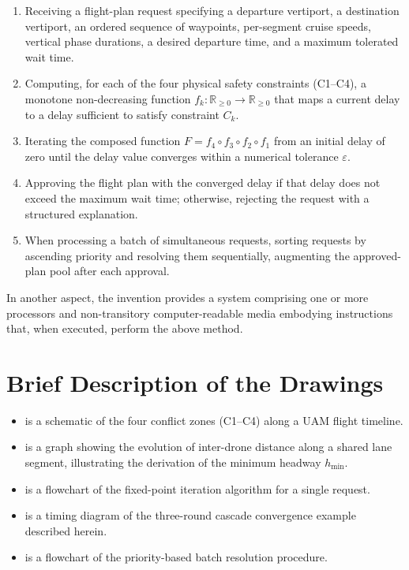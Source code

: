 \documentclass[12pt,a4paper]{article}
\newcommand{\hmin}{h_{\min}}
\begin{document}
\begin{enumerate}[label=(\alph*)]
  \item Receiving a flight-plan request specifying a departure vertiport, a
    destination vertiport, an ordered sequence of waypoints, per-segment
    cruise speeds, vertical phase durations, a desired departure time, and a
    maximum tolerated wait time.

  \item Computing, for each of the four physical safety constraints (C1--C4),
    a monotone non-decreasing function $f_k\colon \mathbb{R}_{\ge 0} \to
    \mathbb{R}_{\ge 0}$ that maps a current delay to a delay sufficient to
    satisfy constraint $C_k$.

  \item Iterating the composed function $F = f_4 \circ f_3 \circ f_2 \circ f_1$
    from an initial delay of zero until the delay value converges within a
    numerical tolerance $\varepsilon$.

  \item Approving the flight plan with the converged delay if that delay does
    not exceed the maximum wait time; otherwise, rejecting the request with a
    structured explanation.

  \item When processing a batch of simultaneous requests, sorting requests by
    ascending priority and resolving them sequentially, augmenting the approved-
    plan pool after each approval.
\end{enumerate}

In another aspect, the invention provides a system comprising one or more
processors and non-transitory computer-readable media embodying instructions
that, when executed, perform the above method.

\section{Brief Description of the Drawings}

\begin{itemize}
  \item[\textbf{FIG.\,1}] is a schematic of the four conflict zones (C1--C4)
    along a UAM flight timeline.

  \item[\textbf{FIG.\,2}] is a graph showing the evolution of inter-drone
    distance along a shared lane segment, illustrating the derivation of the
    minimum headway $\hmin$.

  \item[\textbf{FIG.\,3}] is a flowchart of the fixed-point iteration algorithm
    for a single request.

  \item[\textbf{FIG.\,4}] is a timing diagram of the three-round cascade
    convergence example described herein.

  \item[\textbf{FIG.\,5}] is a flowchart of the priority-based batch resolution
    procedure.
\end{itemize}
\end{document}
